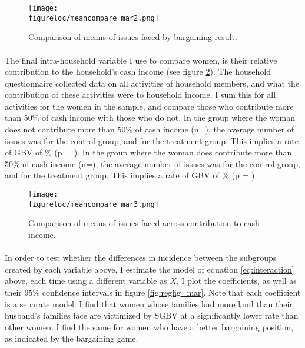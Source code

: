 \documentclass[11pt,a4paper]{scrartcl} %
\newcommand{\figureloc}{C:/Users/Koen/Dropbox/PhD/Papers/CongoGBV/Figures}
\begin{document}
\begin{figure}[H]
  \texttt{[image: \\figureloc/meancompare\_mar2.png]}
  \caption{Comparison of means of issues faced by bargaining result.}
  \label{fig:meancompare_mar2}
\end{figure}

\paragraph{}
The final intra-household variable I use to compare women, is their relative contribution to the household's cash income (see figure \ref{fig:meancompare_mar3}). The household questionnaire collected data on all activities of household members, and what the contribution of these activities were to household income. I sum this for all activities for the women in the sample, and compare those who contribute more than 50\% of cash income with those who do not. In the group where the woman does not contribute more than 50\% of cash income (n=), the average number of issues was  for the control group, and  for the treatment group. This implies a rate of GBV of \% (p = ). In the group where the woman does contribute more than 50\% of cash income (n=), the average number of issues was  for the control group, and  for the treatment group. This implies a rate of GBV of \% (p = ). 

\begin{figure}[H]
  \texttt{[image: \\figureloc/meancompare\_mar3.png]}
  \caption{Comparison of means of issues faced across contribution to cash income.}
  \label{fig:meancompare_mar3}
\end{figure}


\paragraph{}
In order to test whether the differences in incidence between the subgroups created by each variable above, I estimate the model of equation \ref{eq:interaction} above, each time using a different variable as $X$. I plot the coefficients, as well as their 95\% confidence intervals in figure \ref{fig:regfig_mar}. Note that each coefficient is a separate model. I find that women whose families had more land than their husband's families face are victimized by SGBV at a significantly lower rate than other women. I find the same for women who have a better bargaining position, as indicated by the bargaining game.
\end{document}
